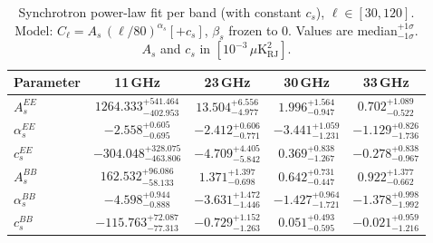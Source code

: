 \begin{table}[htbp]
\centering
\caption{Synchrotron power-law fit per band (with constant $c_s$), $\ell \in [30, 120]$. Model: $C_\ell = A_s\,(\ell/80)^{{\alpha_s}} [+ c_s]$, $\beta_s$ frozen to 0. Values are median$^{{+1\sigma}}_{{-1\sigma}}$. $A_s$ and $c_s$ in $[10^{-3}\,\mu\mathrm{K}^2_\mathrm{RJ}]$.}
\label{tab:sync_single_band_withc_ell30-120}
\begin{tabular}{lcccc}
\toprule
Parameter & 11\,GHz & 23\,GHz & 30\,GHz & 33\,GHz \\
\midrule
$A_s^{EE}$ & $1264.333^{+541.464}_{-402.953}$ & $13.504^{+6.556}_{-4.977}$ & $1.996^{+1.564}_{-0.947}$ & $0.702^{+1.089}_{-0.522}$ \\
$\alpha_s^{EE}$ & $-2.558^{+0.605}_{-0.695}$ & $-2.412^{+0.606}_{-0.771}$ & $-3.441^{+1.059}_{-1.231}$ & $-1.129^{+0.826}_{-1.736}$ \\
$c_s^{EE}$ & $-304.048^{+328.075}_{-463.806}$ & $-4.709^{+4.405}_{-5.842}$ & $0.369^{+0.838}_{-1.267}$ & $-0.278^{+0.838}_{-0.967}$ \\
\midrule
$A_s^{BB}$ & $162.532^{+96.086}_{-58.133}$ & $1.371^{+1.397}_{-0.698}$ & $0.642^{+0.731}_{-0.447}$ & $0.922^{+1.377}_{-0.662}$ \\
$\alpha_s^{BB}$ & $-4.598^{+0.944}_{-0.888}$ & $-3.631^{+1.472}_{-1.446}$ & $-1.427^{+0.964}_{-1.721}$ & $-1.378^{+0.998}_{-1.992}$ \\
$c_s^{BB}$ & $-115.763^{+72.087}_{-77.313}$ & $-0.729^{+1.152}_{-1.263}$ & $0.051^{+0.493}_{-0.595}$ & $-0.021^{+0.959}_{-1.216}$ \\
\bottomrule
\end{tabular}
\end{table}